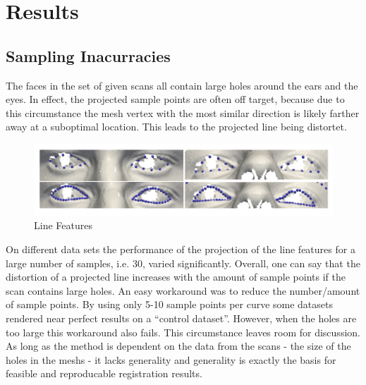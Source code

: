 \chapter{Results}

\section{Sampling Inacurracies}
The faces in the set of given scans all contain large holes around the ears and the eyes. In effect, the projected sample points are often off target, because due to this circumstance the mesh vertex with the most similar direction is likely farther away at a suboptimal location. This leads to the projected line being distortet.
\begin{figure}[h!]
    \centering
    \includegraphics[width=\textwidth]{./resources/img/linefeatures_eyes.pdf}
    \caption{Line Features}
    \label{fig:linefeature_comparison}
\end{figure}

On different data sets the performance of the projection of the line features for a large number of
samples, i.e. 30, varied significantly. Overall, one can say that the distortion of a projected line increases with the amount of sample points if the scan contains large holes.
An easy workaround was to reduce the number/amount of sample points. By using only 5-10 sample points per curve some datasets rendered near perfect results on a ``control dataset''. However, when the holes are too large this workaround also fails. This circumstance leaves room for discussion. As long as the method is dependent on the data from the scans - the size of the holes in the meshs - it lacks generality and generality is exactly the basis for feasible and reproducable registration results.\\

